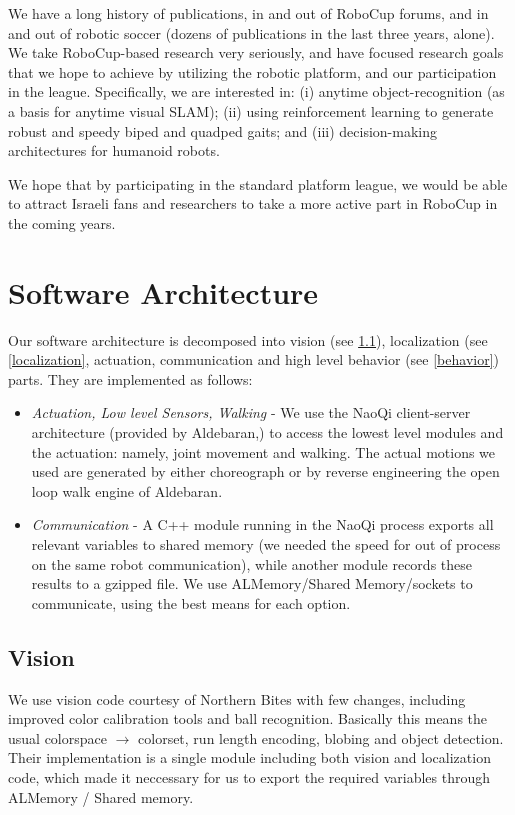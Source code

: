 \documentclass[runningheads,a4paper]{llncs}
\begin{document}
We have a long history of publications, in and out of RoboCup forums, and in
and out of robotic soccer (dozens of publications in the last three years, alone). We
take RoboCup-based research very seriously, and have focused research goals that we
hope to achieve by utilizing the robotic platform, and our participation in the league.
Specifically, we are interested in: (i) anytime object-recognition (as a basis for anytime
visual SLAM); (ii) using reinforcement learning to generate robust and speedy biped
and quadped gaits; and (iii) decision-making architectures for humanoid robots.

We hope that by participating in the standard platform league, we would be able to attract Israeli fans and researchers to take a more active part in RoboCup in the coming years.



\section{Software Architecture}
Our software architecture is decomposed into vision (see \ref{vision}), localization (see \ref{localization}, actuation, communication and high level behavior (see \ref{behavior}) parts. They are implemented as follows:
\begin{itemize}
\item \emph{Actuation, Low level Sensors, Walking} - We use the NaoQi client-server architecture (provided by Aldebaran,) to access the lowest level modules and the actuation: namely, joint movement and walking. The actual motions we used are generated by either choreograph or by reverse engineering the open loop walk engine of Aldebaran.
\item \emph{Communication} - A C++ module running in the NaoQi process exports all relevant variables to shared memory (we needed the speed for out of process on the same robot communication), while another module records these results to a gzipped file. We use ALMemory/Shared Memory/sockets to communicate, using the best means for each option.
\end{itemize}

\subsection{Vision}
\label{vision}
We use vision code courtesy of Northern Bites \cite{northern,northern-repo} with few changes, including improved color calibration tools and ball recognition. Basically this means the usual colorspace $\rightarrow$ colorset, run length encoding, blobing and object detection. Their implementation is a single module including both vision and localization code, which made it neccessary for us to export the required variables through ALMemory / Shared memory.
\end{document}
